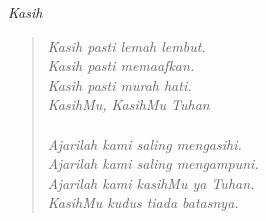\small
\begin{center}
\itshape{Kasih}
\end{center}
\begin{verse}
\itshape{
Kasih pasti lemah lembut.\\ 
Kasih pasti memaafkan.\\
Kasih pasti murah hati.\\
KasihMu, KasihMu Tuhan\\
{~}\\
Ajarilah kami saling mengasihi.\\
Ajarilah kami saling mengampuni.\\
Ajarilah kami kasihMu ya Tuhan.\\
KasihMu kudus tiada batasnya.
}
\end{verse}
\normalsize



